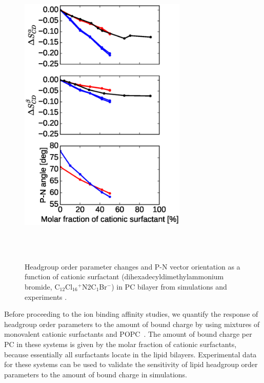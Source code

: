\documentclass[aip,jcp,twocolumn]{revtex4}
\begin{document}
\begin{figure}[tbp]
  \centering
  \includegraphics[width=8.0cm]{../Fig/ipython_nb/PN_angle_OrdPars-A-B_L14-ECCL17_q80_sig89_surf.eps}
  \caption{\label{OrderParameterCHANGESsurf}
    Headgroup order parameter changes and P-N vector orientation as a function of
    cationic surfactant (dihexadecyldimethylammonium bromide, C$_{12}$Cl$_{16}$$^+$N2C$_1$Br$^-$)
    in PC bilayer from simulations and experiments \cite{scherer89}.
  }
   \\
   \\
\end{figure}

Before proceeding to the ion binding affinity studies, we quantify
the response of headgroup order parameters to the amount of 
bound charge by using mixtures of monovalent cationic surfactants
and POPC~\cite{scherer89}. The amount of bound charge per PC 
in these systems is given by the molar fraction of cationic 
surfactants, because essentially all surfactants locate in the 
lipid bilayers. Experimental data for these systems can be used to validate 
the sensitivity of lipid headgroup order parameters
to the amount of bound charge in simulations.
\end{document}
